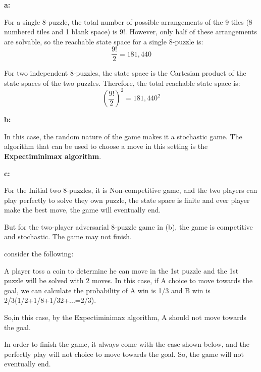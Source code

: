 \documentclass[cn,12pt]{homework}
\begin{document}
\begin{solution}

  \quad

\textbf{a:}

For a single 8-puzzle, the total number of possible arrangements of the 9 tiles (8 numbered tiles and 1 blank space) is \(9!\). However, only half of these arrangements are solvable, so the reachable state space for a single 8-puzzle is:
\[
\frac{9!}{2} = 181,440
\]

For two independent 8-puzzles, the state space is the Cartesian product of the state spaces of the two puzzles. Therefore, the total reachable state space is:
\[
\left(\frac{9!}{2}\right)^2 = 181,440^2 
\]

\textbf{b: }

In this case, the random nature of the game makes it a stochastic game. 
The algorithm that can be used to choose a move in this setting is the \textbf{Expectiminimax algorithm}. 

\textbf{c:}

For the Initial two 8-puzzles, it is Non-competitive game, and the two players can play perfectly to solve they own puzzle, the state space is finite and ever player make the best move, the game will eventually end.


But for the two-player adversarial 8-puzzle game in (b), the game is competitive and stochastic. The game may not finish.

consider the following:

A player toss a coin to determine he can move in the 1st puzzle and the 1st puzzle will be solved with 2 moves. 
In this case, if A choice to move towards the goal, we can calculate the probability of A win is 1/3 and B win is 2/3(1/2+1/8+1/32+...=2/3).

So,in this case, by the Expectiminimax algorithm, A should not move towards the goal.

In order to finish the game, it always come with the case shown below, and the perfectly play will not choice to move towards the goal. So, the game will not  eventually end.



\end{solution}

















\end{document}
